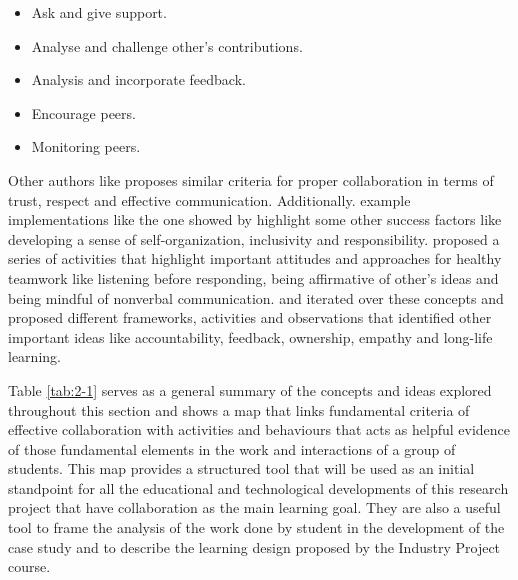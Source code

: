 \begin{itemize}
    \item Ask and give support.
    \item Analyse and challenge other's contributions.
    \item Analysis and incorporate feedback.
    \item Encourage peers.
    \item Monitoring peers.
\end{itemize}

Other authors like \textcite{keay_2006} proposes similar criteria for proper collaboration in terms of trust, respect and effective communication. Additionally.  example implementations like the one showed by \textcite{lingard_2012} highlight some other success factors like
developing a sense of self-organization, inclusivity and responsibility. \textcite{marasi_2019} proposed a series of activities that highlight important attitudes and approaches for healthy teamwork like listening before responding, being affirmative of other's ideas and
being mindful of nonverbal communication. \textcite{davis_2013} and \textcite{asrori_2020} iterated over these concepts and proposed different frameworks, activities and observations that identified other important ideas like accountability, feedback, ownership, empathy
and long-life learning.

Table \ref{tab:2-1} serves as a general summary of the concepts and ideas explored throughout this section and shows a map that links fundamental criteria of effective collaboration with activities and behaviours that acts as helpful evidence of those fundamental elements in
the work and interactions of a group of students. This map provides a structured tool that will be used as an initial standpoint for all the educational and technological developments of this research project that have collaboration as the main learning goal. They are also a
useful tool to frame the analysis of the work done by student in the development of the case study and to describe the learning design proposed by the Industry Project course.

